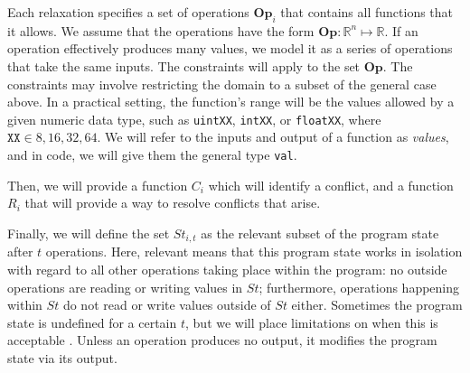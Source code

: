 \documentclass[pageno]{jpaper}
\newcommand{\Op}{\mathrm{\mathbf{Op}}}
\begin{document}
Each relaxation specifies a set of operations $\Op_{i}$ that contains all
functions that it allows. We assume that the operations have the form $\Op:
\mathbb{R}^{n} \mapsto \mathbb{R}$. If an operation effectively produces many
values, we model it as a series of operations that take the same inputs.  The
constraints will apply to the set $\Op$. The constraints may involve restricting
the domain to a subset of the general case above. In a practical setting, the
function's range will be the values allowed by a given numeric data type, such
as \texttt{uintXX}, \texttt{intXX}, or \texttt{float{XX}}, where $\texttt{XX}
\in {8, 16, 32, 64}$. We will refer to the inputs and output of a function as
\emph{values}, and in code, we will give them the general type \texttt{val}.

Then, we will provide a function $C_i$ which will identify a conflict, and a
function $R_i$ that will provide a way to resolve conflicts that arise.

Finally, we will define the set $St_{i,t}$ as the relevant subset of the program
state after $t$ operations. Here, relevant means that this program state works
in isolation with regard to all other operations taking place within the
program: no outside operations are reading or writing values in $St$;
furthermore, operations happening within $St$ do not read or write values
outside of $St$ either. Sometimes the program state is undefined for a certain
$t$, but we will place limitations on when this is acceptable \cite{timeclocks}.
Unless an operation produces no output, it modifies the program state via its
output.
\end{document}
